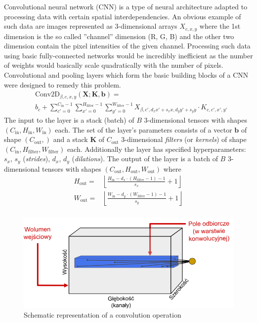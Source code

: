 \documentclass{myclass}
\begin{document}
Convolutional neural network (CNN) is a type of neural architecture adapted to processing data with
certain spatial interdependencies. An obvious example of such data are images represented as
3-dimensional arrays $X_{c,x,y}$ where the 1st dimension is the so called ''channel'' dimension (R,
G, B) and the other two dimension contain the pixel intensities of the given channel. Processing
such data using basic fully-connected networks would be incredibly inefficient as the number of
weights would basically scale quadratically with the number of pixels. Convolutional and pooling
layers which form the basic building blocks of a CNN were designed to remedy this problem.
\[
\boxed{
\begin{split}
   &\text{Conv2D}_{\beta,c,x,y}(\bm{X}; \bm{K}, \bm{b}) = \\
   & b_c + \sum_{c'=0}^{C_\text{in}-1} \sum_{x'=0}^{H_\text{filter}-1} \sum_{y'=0}^{W_\text{filter}-1} X_{\beta, c', d_x x' + s_x x, d_y y' + s_y y} \cdot K_{c,c',x',y'}   
\end{split}
}
\]
The input to the layer is a stack (batch) of $B$ 3-dimensional tensors with shapes $(C_\text{in},
H_\text{in}, W_\text{in})$ each. The set of the layer's parameters consists of a vector $\bm{b}$ of
shape $(C_\text{out},)$ and a stack $\bm{K}$ of $C_\text{out}$ 3-dimensional \emph{filters} (or
\emph{kernels}) of shape $(C_\text{in}, H_\text{filter}, W_\text{filter})$ each. Additionally the
layer has specified hyperparameters: $s_x$, $s_y$ (\emph{strides}), $d_x$, $d_y$ (\emph{dilations}).
The output of the layer is a batch of $B$ 3-dimensional tensors with shapes $(C_\text{out},
H_\text{out}, W_\text{out})$ where
\[
\boxed{
\begin{split}
   H_\text{out} =& \left\lfloor \frac{H_\text{in} - d_x \cdot (H_\text{filter} - 1) - 1}{s_x} + 1 \right\rfloor \\
   W_\text{out} =& \left\lfloor \frac{W_\text{in} - d_y \cdot (W_\text{filter} - 1) - 1}{s_y} + 1 \right\rfloor \\
\end{split}
}
\]
\begin{figure}[ht]
   \centering
   \includegraphics[width=0.9\columnwidth]{figs/conv2d.png}
   \caption{Schematic representation of a convolution operation}
   \label{fig:conv2d}
\end{figure}
\end{document}
